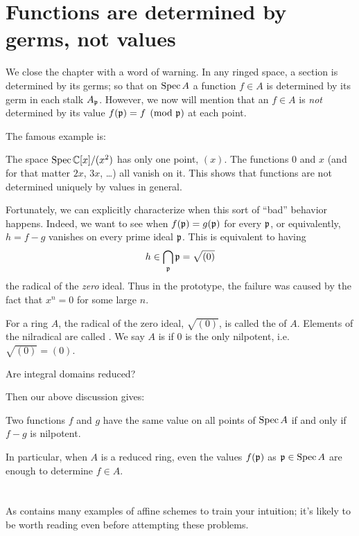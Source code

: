 \section{Functions are determined by germs, not values}

We close the chapter with a word of warning.
In any ringed space, a section is determined by its germs;
so that on $\operatorname{Spec} A$ a function $f \in A$ is determined
by its germ in each stalk $A_\mathfrak p$.
However, we now will mention that an $f \in A$ is \emph{not}
determined by its value $f(\mathfrak p) = f \pmod {\mathfrak p}$ at each point.

The famous example is:
\begin{example}
	The space $\operatorname{Spec} \mathbb C[x] / (x^2)$ has only one point, $(x)$.
	The functions $0$ and $x$ (and for that matter $2x$, $3x$, \dots)
	all vanish on it.
	This shows that functions are not determined uniquely
	by values in general.
\end{example}

Fortunately, we can explicitly characterize
when this sort of ``bad'' behavior happens.
Indeed, we want to see when $f(\mathfrak p) = g(\mathfrak p)$ for every $\mathfrak p$,
or equivalently, $h = f-g$ vanishes on every prime ideal $\mathfrak p$.
This is equivalent to having
\[ h \in \bigcap_{\mathfrak p} \mathfrak p = \sqrt{(0)} \]
the radical of the \emph{zero} ideal.
Thus in the prototype, the failure was caused by the fact that $x^n = 0$
for some large $n$.

\begin{definition}
	For a ring $A$, the radical of the zero ideal, $\sqrt{(0)}$,
	is called the  of $A$.
	Elements of the nilradical are called .
	We say $A$ is  if $0$ is the only nilpotent,
	i.e.\ $\sqrt{(0)} = (0)$.
\end{definition}
\begin{ques}
	Are integral domains reduced?
\end{ques}

Then our above discussion gives:
\begin{theorem}
	Two functions $f$ and $g$ have the same value
	on all points of $\operatorname{Spec} A$ if and only if $f-g$ is nilpotent.
\end{theorem}
In particular, when $A$ is a reduced ring,
even the values $f(\mathfrak p)$ as $\mathfrak p \in \operatorname{Spec} A$
are enough to determine $f \in A$.

\section{\problemhead}
As  contains many
examples of affine schemes to train your intuition;
it's likely to be worth reading even before attempting these problems.

